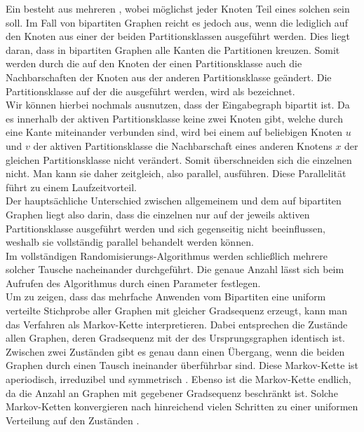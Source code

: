 Ein  besteht aus mehreren , wobei möglichst 
jeder Knoten Teil eines solchen  sein soll. Im Fall von bipartiten Graphen reicht es jedoch
aus, wenn die  lediglich auf den Knoten aus einer der beiden Partitionsklassen ausgeführt werden. Dies
liegt daran, dass in bipartiten Graphen alle Kanten die Partitionen kreuzen. Somit werden durch
die  auf den Knoten der einen Partitionsklasse auch die Nachbarschaften der Knoten aus der anderen
Partitionsklasse geändert. Die Partitionsklasse auf der die  ausgeführt werden, wird als 
 bezeichnet. 
\\

Wir können hierbei nochmals ausnutzen, dass der Eingabegraph bipartit ist. 
Da es innerhalb der aktiven Partitionsklasse
keine zwei Knoten gibt, welche durch eine Kante miteinander verbunden sind, 
wird bei einem \ct{} auf beliebigen Knoten $u$ und $v$ der aktiven Partitionsklasse
die Nachbarschaft eines anderen Knotens $x$ der gleichen Partitionsklasse nicht verändert. Somit
\glqq überschneiden\grqq{} sich die einzelnen  nicht. Man kann sie daher zeitgleich, 
also parallel, ausführen. Diese Parallelität führt zu einem Laufzeitvorteil.
\\

Der hauptsächliche Unterschied zwischen allgemeinem \gc{} und dem auf bipartiten Graphen liegt also darin, 
dass die einzelnen  nur auf der jeweils aktiven Partitionsklasse ausgeführt werden und
sich gegenseitig nicht beeinflussen, weshalb sie vollständig parallel behandelt werden können.
\\

Im vollständigen Randomisierungs-Algorithmus werden schließlich mehrere solcher \gc{} Tausche nacheinander
durchgeführt. Die genaue Anzahl lässt sich beim Aufrufen des Algorithmus durch einen Parameter festlegen.
\\

Um zu zeigen, dass das mehrfache Anwenden vom Bipartiten \gc{} eine uniform verteilte
Stichprobe aller Graphen mit gleicher Gradsequenz erzeugt, kann man das Verfahren als Markov-Kette interpretieren.
Dabei entsprechen die Zustände allen Graphen, deren Gradsequenz mit der des Ursprungsgraphen identisch
ist.
Zwischen zwei Zuständen gibt es genau dann einen Übergang, wenn die beiden Graphen durch einen
\gc{} Tausch ineinander überführbar sind. Diese Markov-Kette 
ist aperiodisch, irreduzibel und symmetrisch \cite{penschuck2020recent}.
 Ebenso ist die Markov-Kette endlich, da die Anzahl an
Graphen mit gegebener Gradsequenz beschränkt ist. 
Solche Markov-Ketten konvergieren nach hinreichend vielen Schritten zu 
einer uniformen Verteilung auf den Zuständen \cite{markov_converge}.





